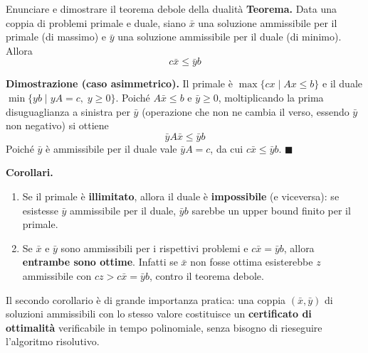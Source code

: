 \documentclass[12pt]{extarticle} %
\begin{document}
\begin{teoriabox}{Enunciare e dimostrare il teorema debole della dualità}
\textbf{Teorema.} Data una coppia di problemi primale e duale, siano $\bar{x}$ una soluzione ammissibile per il primale (di massimo) e $\bar{y}$ una soluzione ammissibile per il duale (di minimo). Allora
\[
c\bar{x} \le \bar{y}b
\]

\noindent\textbf{Dimostrazione (caso asimmetrico).} Il primale è $\max\{cx \mid Ax \le b\}$ e il duale $\min\{yb \mid yA = c, \; y \ge 0\}$. Poiché $A\bar{x} \le b$ e $\bar{y} \ge 0$, moltiplicando la prima disuguaglianza a sinistra per $\bar{y}$ (operazione che non ne cambia il verso, essendo $\bar y$ non negativo) si ottiene
\[
\bar{y}A\bar{x} \le \bar{y}b
\]
Poiché $\bar{y}$ è ammissibile per il duale vale $\bar{y}A = c$, da cui $c\bar{x} \le \bar{y}b$. $\blacksquare$

\noindent\textbf{Corollari.}
\begin{enumerate}
    \item Se il primale è \textbf{illimitato}, allora il duale è \textbf{impossibile} (e viceversa): se esistesse $\bar y$ ammissibile per il duale, $\bar y b$ sarebbe un upper bound finito per il primale.
    \item Se $\bar{x}$ e $\bar{y}$ sono ammissibili per i rispettivi problemi e $c\bar{x} = \bar{y}b$, allora \textbf{entrambe sono ottime}. Infatti se $\bar x$ non fosse ottima esisterebbe $z$ ammissibile con $cz > c\bar x = \bar y b$, contro il teorema debole.
\end{enumerate}
Il secondo corollario è di grande importanza pratica: una coppia $(\bar x, \bar y)$ di soluzioni ammissibili con lo stesso valore costituisce un \textbf{certificato di ottimalità} verificabile in tempo polinomiale, senza bisogno di rieseguire l'algoritmo risolutivo.
\end{teoriabox}
\end{document}
